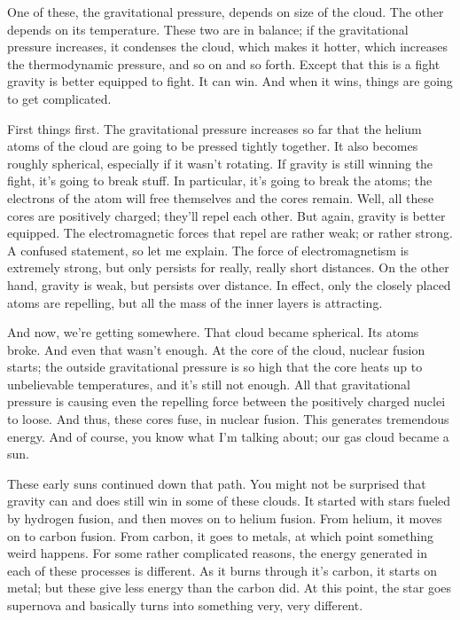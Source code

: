 \begin{multicols}{2}
One of these, the gravitational pressure, depends on size of the cloud. The other depends on its temperature. These two are in balance; if the gravitational pressure increases, it condenses the cloud, which makes it hotter, which increases the thermodynamic pressure, and so on and so forth. Except that this is a fight gravity is better equipped to fight. It can win. And when it wins, things are going to get complicated.

First things first. The gravitational pressure increases so far that the helium atoms of the cloud are going to be pressed tightly together. It also becomes roughly spherical, especially if it wasn't rotating. If gravity is still winning the fight, it's going to break stuff. In particular, it's going to break the atoms; the electrons of the atom will free themselves and the cores remain. Well, all these cores are positively charged; they'll repel each other. But again, gravity is better equipped. The electromagnetic forces that repel are rather weak; or rather strong. A confused statement, so let me explain. The force of electromagnetism is extremely strong, but only persists for really, really short distances. On the other hand, gravity is weak, but persists over distance. In effect, only the closely placed atoms are repelling, but all the mass of the inner layers is attracting.

And now, we're getting somewhere. That cloud became spherical. Its atoms broke. And even that wasn't enough. At the core of the cloud, nuclear fusion starts; the outside gravitational pressure is so high that the core heats up to unbelievable temperatures, and it's still not enough. All that gravitational pressure is causing even the repelling force between the positively charged nuclei to loose. And thus, these cores fuse, in nuclear fusion. This generates tremendous energy. And of course, you know what I'm talking about; our gas cloud became a sun.

These early suns continued down that path. You might not be surprised that gravity can and does still win in some of these clouds. It started with stars fueled by hydrogen fusion, and then moves on to helium fusion. From helium, it moves on to carbon fusion. From carbon, it goes to metals, at which point something weird happens. For some rather complicated reasons, the energy generated in each of these processes is different. As it burns through it's carbon, it starts on metal; but these give less energy than the carbon did. At this point, the star goes supernova and basically turns into something very, very different.


\end{multicols}
